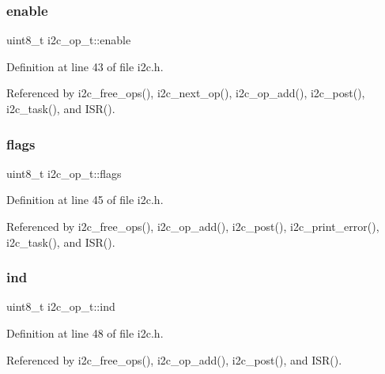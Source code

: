 \subsubsection{\texorpdfstring{enable}{enable}}
{\footnotesize\ttfamily uint8\+\_\+t i2c\+\_\+op\+\_\+t\+::enable}



Definition at line 43 of file i2c.\+h.



Referenced by i2c\+\_\+free\+\_\+ops(), i2c\+\_\+next\+\_\+op(), i2c\+\_\+op\+\_\+add(), i2c\+\_\+post(), i2c\+\_\+task(), and I\+S\+R().

\mbox{\label{structi2c__op__t_a99ce5c1c16cf8a7b8293f5b96ac74c27}} 
\subsubsection{\texorpdfstring{flags}{flags}}
{\footnotesize\ttfamily uint8\+\_\+t i2c\+\_\+op\+\_\+t\+::flags}



Definition at line 45 of file i2c.\+h.



Referenced by i2c\+\_\+free\+\_\+ops(), i2c\+\_\+op\+\_\+add(), i2c\+\_\+post(), i2c\+\_\+print\+\_\+error(), i2c\+\_\+task(), and I\+S\+R().

\mbox{\label{structi2c__op__t_acad1e9f50a862e2c96c8a62a1ff1694a}} 
\subsubsection{\texorpdfstring{ind}{ind}}
{\footnotesize\ttfamily uint8\+\_\+t i2c\+\_\+op\+\_\+t\+::ind}



Definition at line 48 of file i2c.\+h.



Referenced by i2c\+\_\+free\+\_\+ops(), i2c\+\_\+op\+\_\+add(), i2c\+\_\+post(), and I\+S\+R().

\mbox{\label{structi2c__op__t_a15938288603b868319e12027d5b0853b}} 
